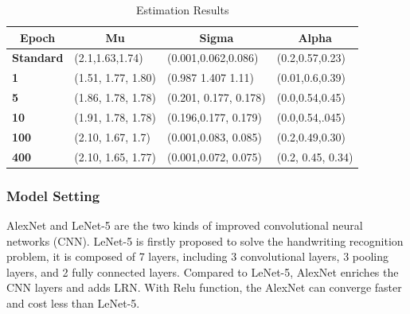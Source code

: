 \documentclass[conference]{IEEEtran}
\begin{document}
\begin{table}
    \caption{Estimation Results}
    \begin{tabular}{|l|l|l|l|}
    \hline
    \multicolumn{1}{|c|}{\textbf{Epoch}} & \multicolumn{1}{c|}{\textbf{Mu}} & \multicolumn{1}{c|}{\textbf{Sigma}} & \multicolumn{1}{c|}{\textbf{Alpha}} \\ \hline
    \textbf{Standard}                    & (2.1,1.63,1.74)                  & (0.001,0.062,0.086)                 & (0.2,0.57,0.23)                     \\ \hline
    \textbf{1}                           & (1.51, 1.77, 1.80)               & (0.987 1.407 1.11)                  & (0.01,0.6,0.39)                     \\ \hline
    \textbf{5}                           & (1.86, 1.78, 1.78)               & (0.201, 0.177, 0.178)               & (0.0,0.54,0.45)                     \\ \hline
    \textbf{10}                          & (1.91, 1.78, 1.78)               & (0.196,0.177, 0.179)                & (0.0,0.54,.045)                     \\ \hline
    \textbf{100}                         & (2.10, 1.67, 1.7)                & (0.001,0.083, 0.085)                & (0.2,0.49,0.30)                     \\ \hline
    \textbf{400}                         & (2.10, 1.65, 1.77)               & (0.001,0.072, 0.075)                & (0.2, 0.45, 0.34)                   \\ \hline
    \end{tabular}
    \end{table}
\subsubsection{Model Setting}
AlexNet\cite{krizhevsky2012imagenet} and LeNet-5\cite{lecun1998gradient} are the two kinds of improved convolutional neural networks 
(CNN). LeNet-5 is firstly proposed to solve the handwriting recognition problem,
it is composed of 7 layers, including 3 convolutional layers,
3 pooling layers, and 2 fully connected layers. Compared to LeNet-5, 
AlexNet enriches the CNN layers and adds LRN. With Relu function,
the AlexNet can converge faster and cost less than LeNet-5.
\end{document}

